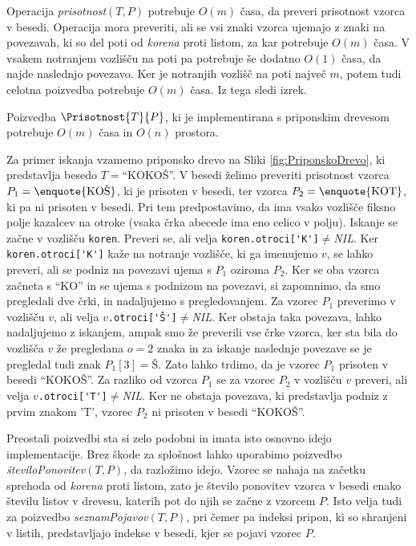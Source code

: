 Operacija \textit{prisotnost}$(T,P)$ potrebuje $O(m)$ časa, da preveri prisotnost vzorca v besedi. Operacija mora preveriti, ali se vsi znaki vzorca ujemajo z znaki na povezavah, ki so del poti od \textit{korena} proti listom, za kar potrebuje $O(m)$ časa. V vsakem notranjem vozlišču na poti pa potrebuje še dodatno $O(1)$ časa, da najde naslednjo povezavo. Ker je notranjih vozlišč na poti največ $m$, potem tudi celotna poizvedba potrebuje $O(m)$ časa. Iz tega sledi izrek.

\begin{izr}
    Poizvedba $\Prisotnost{T}{P}$, ki je implementirana s priponskim drevesom potrebuje $O(m)$ časa in $O(n)$ prostora.
\end{izr}

Za primer iskanja vzamemo priponsko drevo na Sliki \ref{fig:PriponskoDrevo}, ki predstavlja besedo $T=$\enquote{KOKOŠ}. V besedi želimo preveriti prisotnost vzorca $P_1=\text{\enquote{KOŠ}}$, ki je prisoten v besedi, ter vzorca $P_2=\text{\enquote{KOT}}$, ki pa ni prisoten v besedi. Pri tem predpostavimo, da ima vsako vozlišče fiksno polje kazalcev na otroke (vsaka črka abecede ima eno celico v polju). Iskanje se začne v vozlišču \verb|koren|. Preveri se, ali velja \verb|koren.otroci['K']|$\ne$\textit{NIL}. Ker \verb|koren.otroci['K']| kaže na notranje vozlišče, ki ga imenujemo $v$, se lahko preveri, ali se podniz na povezavi ujema s $P_1$ oziroma $P_2$. Ker se oba vzorca začneta s \enquote{KO} in se ujema s podnizom na povezavi, si zapomnimo, da smo pregledali dve črki, in nadaljujemo s pregledovanjem. Za vzorec $P_1$ preverimo v vozlišču $v$, ali velja $v$\verb|.otroci['Š']|$\ne$\textit{NIL}. Ker obstaja taka povezava, lahko nadaljujemo z iskanjem, ampak smo že preverili vse črke vzorca, ker sta bila do vozlišča $v$ že pregledana $o=2$ znaka in za iskanje naslednje povezave se je pregledal tudi znak $P_1[3]=\text{Š}$. Zato lahko trdimo, da je vzorec $P_1$ prisoten v besedi \enquote{KOKOŠ}. Za razliko od vzorca $P_1$ se za vzorec $P_2$ v vozlišču $v$ preveri, ali velja $v$\verb|.otroci['T']|$\ne$\textit{NIL}. Ker ne obstaja povezava, ki predstavlja podniz z prvim znakom 'T', vzorec $P_2$ ni prisoten v besedi \enquote{KOKOŠ}.

Preostali poizvedbi sta si zelo podobni in imata isto osnovno idejo implementacije. Brez škode za splošnost lahko uporabimo poizvedbo \textit{številoPonovitev}$(T,P)$, da razložimo idejo. Vzorec se nahaja na začetku sprehoda od \textit{korena} proti listom, zato je število ponovitev vzorca v besedi enako številu listov v drevesu, katerih pot do njih se začne z vzorcem $P$. Isto velja tudi za poizvedbo \textit{seznamPojavov}$(T,P)$, pri čemer pa indeksi pripon, ki so shranjeni v listih, predstavljajo indekse v besedi, kjer se pojavi vzorec $P$.

